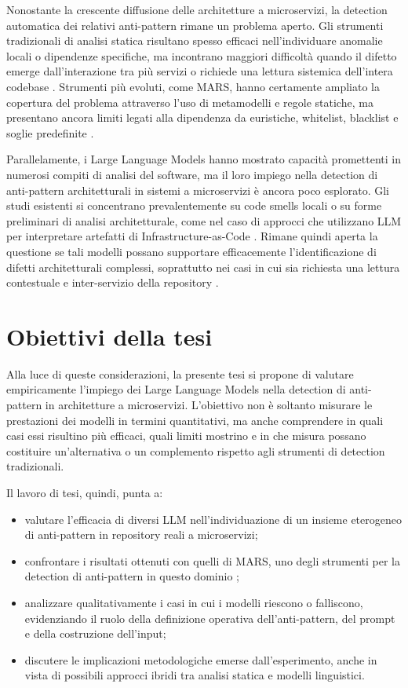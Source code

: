 Nonostante la crescente diffusione delle architetture a microservizi, la detection automatica dei relativi anti-pattern rimane un problema aperto. Gli strumenti tradizionali di analisi statica risultano spesso efficaci nell’individuare anomalie locali o dipendenze specifiche, ma incontrano maggiori difficoltà quando il difetto emerge dall’interazione tra più servizi o richiede una lettura sistemica dell’intera codebase \cite{CernyCatalogo, MSAnose}. Strumenti più evoluti, come MARS, hanno certamente ampliato la copertura del problema attraverso l’uso di metamodelli e regole statiche, ma presentano ancora limiti legati alla dipendenza da euristiche, whitelist, blacklist e soglie predefinite \cite{MARS}.

Parallelamente, i Large Language Models hanno mostrato capacità promettenti in numerosi compiti di analisi del software, ma il loro impiego nella detection di anti-pattern architetturali in sistemi a microservizi è ancora poco esplorato. Gli studi esistenti si concentrano prevalentemente su code smells locali o su forme preliminari di analisi architetturale, come nel caso di approcci che utilizzano LLM per interpretare artefatti di Infrastructure-as-Code \cite{iac_llm}. Rimane quindi aperta la questione se tali modelli possano supportare efficacemente l’identificazione di difetti architetturali complessi, soprattutto nei casi in cui sia richiesta una lettura contestuale e inter-servizio della repository \cite{contextwindows_llm, prompteng}.

\section{Obiettivi della tesi}

Alla luce di queste considerazioni, la presente tesi si propone di valutare empiricamente l’impiego dei Large Language Models nella detection di anti-pattern in architetture a microservizi. L’obiettivo non è soltanto misurare le prestazioni dei modelli in termini quantitativi, ma anche comprendere in quali casi essi risultino più efficaci, quali limiti mostrino e in che misura possano costituire un’alternativa o un complemento rispetto agli strumenti di detection tradizionali.

Il lavoro di tesi, quindi, punta a:
\begin{itemize}
    \item valutare l’efficacia di diversi LLM nell’individuazione di un insieme eterogeneo di anti-pattern in repository reali a microservizi;
    \item confrontare i risultati ottenuti con quelli di MARS, uno degli strumenti per la detection di anti-pattern in questo dominio \cite{MARS};
    \item analizzare qualitativamente i casi in cui i modelli riescono o falliscono, evidenziando il ruolo della definizione operativa dell’anti-pattern, del prompt e della costruzione dell’input;
    \item discutere le implicazioni metodologiche emerse dall’esperimento, anche in vista di possibili approcci ibridi tra analisi statica e modelli linguistici.
\end{itemize}

